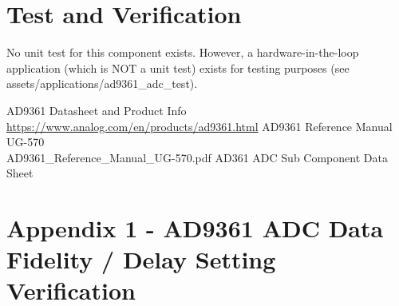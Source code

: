 \documentclass{article}
\begin{document}
\pagebreak
\section*{Test and Verification}
No unit test for this component exists. However, a hardware-in-the-loop
application (which is NOT a unit test) exists for testing purposes (see
assets/applications/ad9361\_adc\_test).

\begin{thebibliography}{1}

 AD9361 Datasheet and Product Info \\
\url{
https://www.analog.com/en/products/ad9361.html}
 AD9361 Reference Manual UG-570\\
AD9361\_Reference\_Manual\_UG-570.pdf
 AD361 ADC Sub Component Data Sheet \\

\end{thebibliography}
\pagebreak
\section{Appendix 1 - AD9361 ADC Data Fidelity / Delay Setting Verification}
\end{document}
